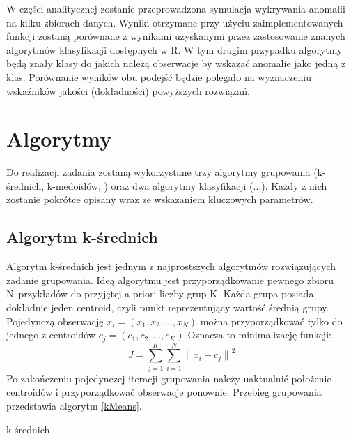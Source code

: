 \documentclass[11pt,a4paper,twoside]{article}
\begin{document}
W części analitycznej zostanie przeprowadzona symulacja wykrywania anomalii na kilku zbiorach danych. Wyniki otrzymane przy użyciu zaimplementowanych funkcji zostaną porównane z wynikami uzyskanymi przez zastosowanie znanych algorytmów klasyfikacji dostępnych w R. W tym drugim przypadku algorytmy będą znały klasy do jakich należą obserwacje by wskazać anomalie jako jedną z klas. Porównanie wyników obu podejść będzie polegało na wyznaczeniu wskaźników jakości (dokładności) powyższych rozwiązań.

\section{Algorytmy}
Do realizacji zadania zostaną wykorzystane trzy algorytmy grupowania (k-średnich, k-medoidów, ) oraz dwa algorytmy klasyfikacji (...). Każdy z nich zostanie pokrótce opisany wraz ze wskazaniem kluczowych parametrów.

\subsection{Algorytm k-średnich}
Algorytm k-średnich jest jednym z najprostszych algorytmów rozwiązujących zadanie grupowania. Ideą algorytmu jest przyporządkowanie pewnego zbioru \mbox{N przykładów} do przyjętej a priori liczby grup K. Każda grupa posiada dokładnie jeden centroid, czyli punkt reprezentujący wartość średnią grupy. Pojedynczą obserwację $x_{i} = (x_{1}, x_{2},\ldots, x_{N})$ można przyporządkować tylko do jednego z centroidów $c_{j} = (c_{1}, c_{2},\ldots, c_{K})$ Oznacza to minimalizację funkcji: \begin{equation}
J = \sum_{j=1}^{K}{\sum_{i=1}^{N} {\|x_{i}-c_{j}\|}^{2}}
\end{equation} Po zakończeniu pojedynczej iteracji grupowania należy uaktualnić położenie centroidów i przyporządkować obserwacje ponownie. Przebieg grupowania przedstawia algorytm \ref{kMeans}.
\begin{algorithm}[ht]
\caption{k-średnich}
\label{kMeans}
	\begin{algorithmic}%
	\end{algorithmic}
\end{algorithm}
\end{document}
